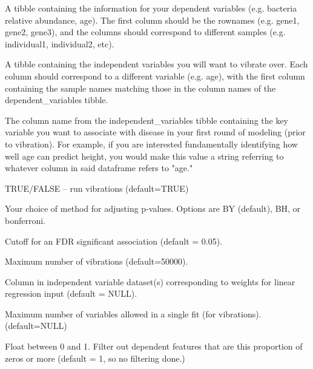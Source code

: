 \documentclass[a4paper]{book}
\begin{document}
\begin{Arguments}
\begin{ldescription}
\item[\code{dependent\_variables}] A tibble containing the information for your dependent variables (e.g. bacteria relative abundance, age). The first column should be the rownames (e.g. gene1, gene2, gene3), and the columns should correspond to different samples (e.g. individual1, individual2, etc).

\item[\code{independent\_variables}] A tibble containing the independent variables you will want to vibrate over. Each column should correspond to a different variable (e.g. age), with the first column containing the sample names matching those in the column names of the dependent\_variables tibble.

\item[\code{primary\_variable}] The column name from the independent\_variables tibble containing the key variable you want to associate with disease in your first round of modeling (prior to vibration). For example, if you are interested fundamentally identifying how well age can predict height, you would make this value a string referring to whatever column in said dataframe refers to "age."

\item[\code{vibrate}] TRUE/FALSE -- run vibrations (default=TRUE)

\item[\code{fdr\_method}] Your choice of method for adjusting p-values. Options are BY (default), BH, or bonferroni.

\item[\code{fdr\_cutoff}] Cutoff for an FDR significant association (default = 0.05).

\item[\code{max\_vibration\_num}] Maximum number of vibrations (default=50000).

\item[\code{regression\_weights}] Column in independent variable dataset(s) corresponding to weights  for linear regression input (default = NULL).

\item[\code{max\_vars\_in\_model}] Maximum number of variables allowed in a single fit (for vibrations). (default=NULL)

\item[\code{proportion\_cutoff}] Float between 0 and 1. Filter out dependent features that are this proportion of zeros or more (default = 1, so no filtering done.)


\end{ldescription}
\end{Arguments}
\end{document}
